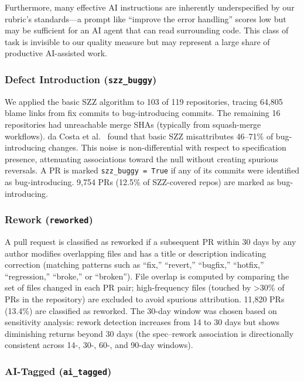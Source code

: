 \documentclass[a4paper,UKenglish,cleveref,autoref,thm-restate]{lipics-v2021}
\begin{document}
Furthermore, many effective AI instructions are inherently underspecified by our rubric's standards---a prompt like ``improve the error handling'' scores low but may be sufficient for an AI agent that can read surrounding code. This class of task is invisible to our quality measure but may represent a large share of productive AI-assisted work.

\subsubsection{Defect Introduction (\texttt{szz\_buggy})}

We applied the basic SZZ algorithm \cite{szz2005} to 103 of 119 repositories, tracing 64,805 blame links from fix commits to bug-introducing commits. The remaining 16 repositories had unreachable merge SHAs (typically from squash-merge workflows). da Costa et al.\ \cite{dacosta2017} found that basic SZZ misattributes 46--71\% of bug-introducing changes. This noise is non-differential with respect to specification presence, attenuating associations toward the null without creating spurious reversals. A PR is marked \texttt{szz\_buggy = True} if any of its commits were identified as bug-introducing. 9,754 PRs (12.5\% of SZZ-covered repos) are marked as bug-introducing.

\subsubsection{Rework (\texttt{reworked})}

A pull request is classified as reworked if a subsequent PR within 30 days by any author modifies overlapping files and has a title or description indicating correction (matching patterns such as ``fix,'' ``revert,'' ``bugfix,'' ``hotfix,'' ``regression,'' ``broke,'' or ``broken''). File overlap is computed by comparing the set of files changed in each PR pair; high-frequency files (touched by >30\% of PRs in the repository) are excluded to avoid spurious attribution. 11,820 PRs (13.4\%) are classified as reworked. The 30-day window was chosen based on sensitivity analysis: rework detection increases from 14 to 30 days but shows diminishing returns beyond 30 days (the spec--rework association is directionally consistent across 14-, 30-, 60-, and 90-day windows).

\subsubsection{AI-Tagged (\texttt{ai\_tagged})}
\end{document}
